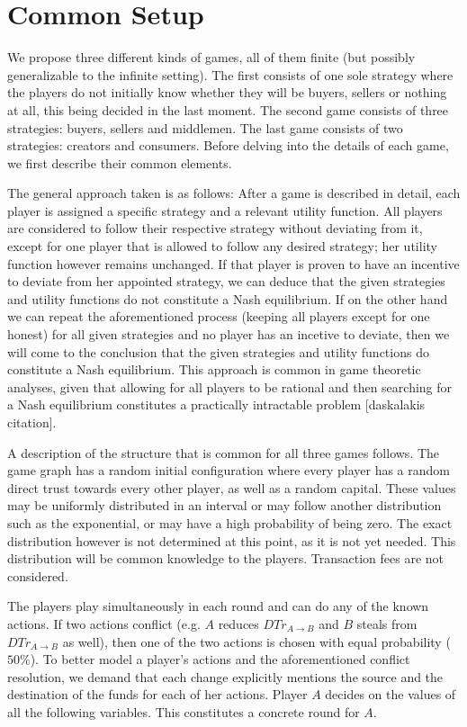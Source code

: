 \section{Common Setup}
  We propose three different kinds of games, all of them finite (but possibly generalizable to the infinite setting). The first
  consists of one sole strategy where the players do not initially know whether they will be buyers, sellers or nothing at all,
  this being decided in the last moment. The second game consists of three strategies: buyers, sellers and middlemen. The last
  game consists of two strategies: creators and consumers. Before delving into the details of each game, we first describe their
  common elements.
  
  The general approach taken is as follows: After a game is described in detail, each player is assigned a specific strategy and
  a relevant utility function. All players are considered to follow their respective strategy without deviating from it, except
  for one player that is allowed to follow any desired strategy; her utility function however remains unchanged. If that player
  is proven to have an incentive to deviate from her appointed strategy, we can deduce that the given strategies and utility
  functions do not constitute a Nash equilibrium. If on the other hand we can repeat the aforementioned process (keeping all
  players except for one honest) for all given strategies and no player has an incetive to deviate, then we will come to the
  conclusion that the given strategies and utility functions do constitute a Nash equilibrium. This approach is common in game
  theoretic analyses, given that allowing for all players to be rational and then searching for a Nash equilibrium constitutes a
  practically intractable problem [daskalakis citation].
  
  A description of the structure that is common for all three games follows. The game graph has a random initial configuration
  where every player has a random direct trust towards every other player, as well as a random capital. These values may be
  uniformly distributed in an interval or may follow another distribution such as the exponential, or may have a high
  probability of being zero. The exact distribution however is not determined at this point, as it is not yet needed. This
  distribution will be common knowledge to the players. Transaction fees are not considered.
  
  The players play simultaneously in each round and can do any of the known actions. If two actions conflict (e.g. $A$ reduces
  $DTr_{A \rightarrow B}$ and $B$ steals from $DTr_{A \rightarrow B}$ as well), then one of the two actions is chosen with equal
  probability ($50\%$). To better model a player's actions and the aforementioned conflict resolution, we demand that each
  change explicitly mentions the source and the destination of the funds for each of her actions. Player $A$ decides on the
  values of all the following variables. This constitutes a concrete round for $A$.
  
